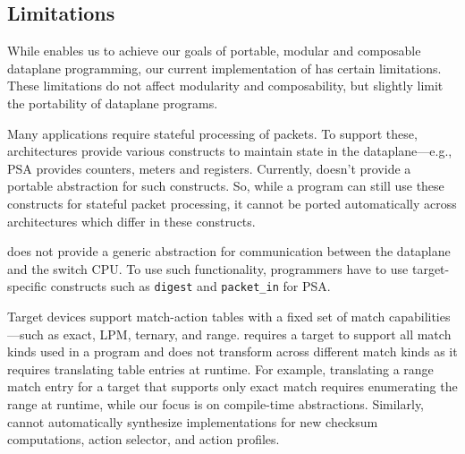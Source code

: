 \documentclass[letterpaper,twocolumn,10pt]{article}
\begin{document}
\subsection{Limitations}
\label{sec:limitations}
While \ulang enables us to achieve our goals of portable, modular and
composable dataplane programming, our current implementation of \ucomp
has certain limitations. These limitations do not affect modularity
and composability, but slightly limit the portability of dataplane
programs.

Many applications require stateful processing of packets. To support
these, architectures provide various constructs to maintain state in
the dataplane---e.g., PSA provides counters, meters and registers.
Currently, \uarch doesn't provide a portable abstraction for such
constructs. So, while a \ulang program can still use these constructs
for stateful packet processing, it cannot be ported automatically
across architectures which differ in these constructs.

\uarch does not provide a generic abstraction for communication
between the dataplane and the switch CPU. To use such functionality,
programmers have to use target-specific constructs such as
\texttt{digest} and \texttt{packet\_in} for PSA.

Target devices support match-action tables with a fixed set of match
capabilities---such as exact, LPM, ternary, and range. \ulang requires
a target to support all match kinds used in a program and \ucomp does
not transform across different match kinds as it requires translating
table entries at runtime. For example, translating a range match entry
for a target that supports only exact match requires enumerating the
range at runtime, while our focus is on compile-time abstractions.
Similarly, \ulang cannot automatically synthesize implementations for
new checksum computations, action selector, and action profiles.

\end{document}
